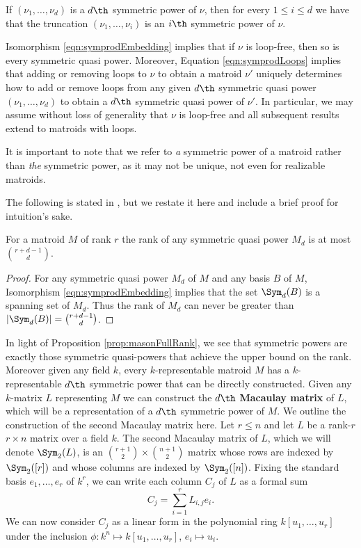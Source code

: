\begin{remark}
If $(\nu_1,\dots,\nu_d)$ is a $d\th$ symmetric power of $\nu$, then for every $1\leq i\leq d$ we have that the truncation $(\nu_1,\dots,\nu_i)$ is an $i\th$ symmetric power of $\nu$.
\end{remark}



\begin{remark}\label{rem:loopless}
Isomorphism \ref{eqn:symprodEmbedding} implies that if $\nu$ is loop-free, then so is every symmetric quasi power. Moreover, Equation \ref{eqn:symprodLoops} implies that adding or removing loops to $\nu$ to obtain a matroid $\nu'$ uniquely determines how to add or remove loops from any given $d\th$ symmetric quasi power $(\nu_1,\dots,\nu_d)$ to obtain a $d\th$ symmetric quasi power of $\nu'$. In particular, we may assume without loss of generality that $\nu$ is loop-free and all subsequent results extend to matroids with loops.
\end{remark}

It is important to note that we refer to \textit{a} symmetric power of a matroid rather than \textit{the} symmetric power, as it may not be unique, not even for realizable matroids.

The following is stated in \cite{MGlueing}, but we restate it here and include a brief proof for intuition's sake.

\begin{proposition}\cite{MGlueing}\label{prop:masonFullRank}
    For a matroid $M$ of rank $r$ the rank of any symmetric quasi power $M_d$ is at most $\binom{r+d-1}{d}$.
\end{proposition}

\begin{proof}
For any symmetric quasi power $M_d$ of $M$ and any basis $B$ of $M$, Isomorphism \ref{eqn:symprodEmbedding} implies that the set $\Sym_d(B)$ is a spanning set of $M_d$. Thus the rank of $M_d$ can never be greater than $|\Sym_d(B)|=\binom{r+d-1}{d}$. 
\end{proof}
 In light of Proposition \ref{prop:masonFullRank}, we see that symmetric powers are exactly those symmetric quasi-powers that achieve the upper bound on the rank. Moreover given any field $k$, every $k$-representable matroid $M$ has a $k$-representable $d\th$ symmetric power that can be directly constructed. Given any $k$-matrix $L$ representing $M$ we can construct the $d\th$ \textbf{Macaulay matrix} of $L$, which will be a representation of a $d\th$ symmetric power of $M$. We outline the construction of the second Macaulay matrix here. Let $r\leq n$ and let $L$ be a rank-$r$ $r\times n$ matrix over a field $k$. The second Macaulay matrix of $L$, which we will denote $\Sym_2(L)$, is an $\binom{r+1}{2}\times \binom{n+1}{2}$ matrix whose rows are indexed by $\Sym_2([r])$ and whose columns are indexed by $\Sym_2([n])$. Fixing the standard basis $e_1,\dots,e_r$ of $k^r$, we can write each column $C_j$ of $L$ as a formal sum 
$$C_j = \sum_{i=1}^r L_{i,j}e_i.$$
We can now consider $C_j$ as a linear form in the polynomial ring $k[u_1,\dots,u_r]$ under the inclusion $\phi:k^n\mapsto k[u_1,\dots,u_r]$, $e_i\mapsto u_i$.


